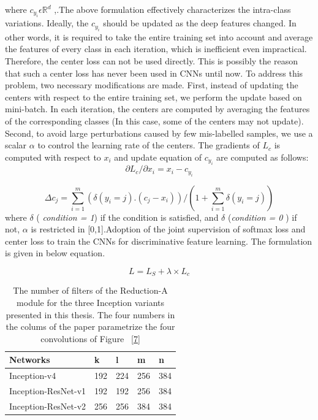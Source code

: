 \documentclass[a4paper,12pt, twoside]{NITKReport}
\begin{document}
\par where $c_{y_{i}} \epsilon \mathbb{R}^{d}$ ,.The above formulation effectively characterizes the intra-class variations. Ideally, the $c_{y_{i}}$ should be updated as the deep features changed. In other words, it is required to take the entire training set into account and average the features of every class in each iteration, which is inefficient even impractical. Therefore, the center loss can not be used directly. This is possibly the reason that such a center loss has never been used in CNNs until now. To address this problem, two necessary modifications are made. First, instead of updating the centers with respect to the entire training set, we perform the update based on mini-batch. In each iteration, the centers are computed by averaging the features of the corresponding classes (In this case, some of the centers may not update). Second, to avoid large perturbations caused by few mis-labelled samples, we use a scalar $\alpha$ to control the learning rate of the centers. The gradients of $L_{c}$ is computed with respect to $x{_{i}}$ and update equation of $c_{y_{i}}$ are computed as follows:
\begin{equation}
\partial L_{c} / \partial x_{i} = x_{i} - c_{y_{i}}
\end{equation}

\begin{equation}
\Delta c_{j}=\sum_{i=1}^{m} (\delta (y_{i}=j).(c_{j}-x{_i}) ) / (1+\sum_{i=1}^{m} \delta(y_{i}=j))
\end{equation}
where $\delta$ (\textit{ condition = 1}) if the condition is satisfied, and $\delta$ (\textit{condition = 0 }) if not, $\alpha$ is restricted in [0,1].Adoption of the joint supervision of softmax loss and center loss to train the CNNs for discriminative feature learning. \cite{wen2016discriminative} The formulation is given in below equation.

\begin{equation}
L = L_{S} + \lambda \times L_{c} 
\end{equation}

\begin{table}
  \centering
\begin{tabular}{ |p{5cm}|p{2.5cm}|p{2.5cm}|p{2.5cm}|p{2.5cm}|}
 \hline
 Networks & k & l & m & n\\
 \hline
 Inception-v4 & 192 & 224 & 256 & 384\\
 \hline
 Inception-ResNet-v1 & 192 & 192 & 256 & 384\\
 \hline
 Inception-ResNet-v2 & 256 & 256 & 384 & 384\\
 \hline
\end{tabular}
\caption{The number of filters of the Reduction-A module for the
three Inception variants presented in this thesis. The four numbers
in the colums of the paper parametrize the four convolutions of
Figure ~\ref{7}}\label{table:number_of_filters}
\end{table}
\end{document}
